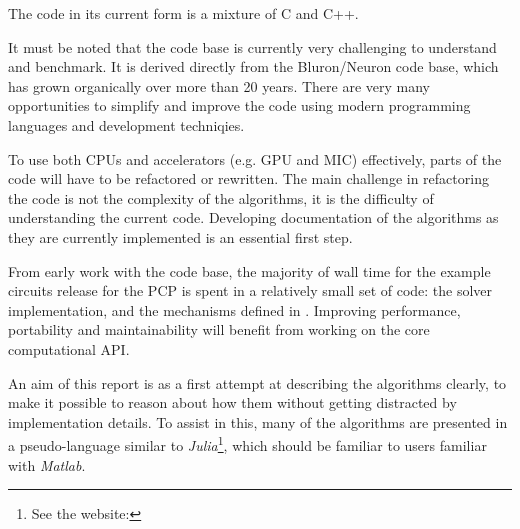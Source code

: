 The code in its current form is a mixture of C and C++.

It must be noted that the code base is currently very challenging to understand and benchmark. It is derived directly from the Bluron/Neuron code base, which has grown organically over more than 20 years. There are very many opportunities to simplify and improve the code using modern programming languages and development techniqies.

To use both CPUs and accelerators (e.g. GPU and MIC) effectively, parts of the code will have to be refactored or rewritten. The main challenge in refactoring the code is not the complexity of the algorithms, it is the difficulty of understanding the current code. Developing documentation of the algorithms as they are currently implemented is an essential first step.

From early work with the code base, the majority of wall time for the example circuits release for the PCP is spent in a relatively small set of code: the  solver implementation, and the mechanisms defined in . Improving performance, portability and maintainability will benefit from working on the core computational API.

An aim of this report is as a first attempt at describing the algorithms clearly, to make it possible to reason about how them without getting distracted by implementation details. To assist in this, many of the algorithms are presented in a pseudo-language similar to \emph{Julia}\footnote{See the website: }, which should be familiar to users familiar with \emph{Matlab}.

